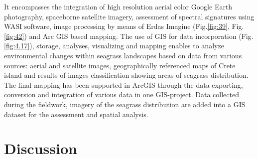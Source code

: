 \documentclass[11pt]{article}
\begin{document}
It encompasses the integration of
high resolution aerial color Google Earth photography, spaceborne satellite imagery, assessment of
spectral signatures using \ac{WASI} software, image processing by means of Erdas Imagine (Fig.\ref{fig:39}, Fig.\ref{fig:42}) and Arc \ac{GIS} based mapping. The use of \ac{GIS} for data incorporation (Fig.\ref{fig:4.17}), storage, analyses, visualizing and mapping
enables to analyze environmental changes within seagrass landscapes based on data from various
sources: aerial and satellite images, geographically referenced maps of Crete island and results of
images classification showing areas of seagrass distribution.
The final mapping has been supported in ArcGIS through the data exporting, conversion and
integration of various data in one \ac{GIS}-project. Data collected during the fieldwork, imagery
of the seagrass distribution are added into a \ac{GIS} dataset for the assessment and spatial analysis.

\section{Discussion}\label{sec:5}
\end{document}
